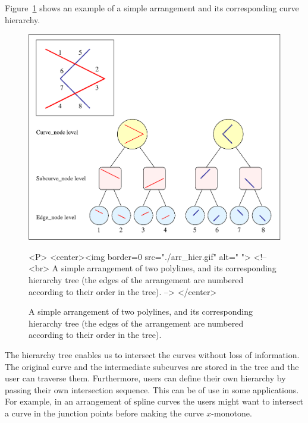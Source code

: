 Figure~\ref{fig:hierarchy} shows an example of a simple arrangement and its 
corresponding curve hierarchy.


\begin{figure}
\begin{ccTexOnly}
{\centering \resizebox*{0.6\textheight}{0.5\textheight}
{\includegraphics{arr_hier.ps}}}
\end{ccTexOnly}
\caption{A simple arrangement of two polylines, and its corresponding
hierarchy tree (the edges of the arrangement are numbered according to
their order in the tree).\label{fig:hierarchy}}
\begin{ccHtmlOnly}
<P>
<center><img border=0 src="./arr_hier.gif" alt=" ">
<!--
<br>
A simple arrangement of two polylines, and its corresponding hierarchy tree
(the edges of the arrangement are numbered according to their order
in the tree).
-->
</center>
\end{ccHtmlOnly}
\end{figure}

The hierarchy tree enables us to intersect the curves without loss of
information. The original curve and the intermediate subcurves are stored
in the tree and the user can traverse them. Furthermore, users can
define their own hierarchy by passing their own intersection sequence.
This can be of use in some applications. For example, in an arrangement
of spline curves the users might want to intersect a curve in the
junction points before making the curve $x$-monotone. 

